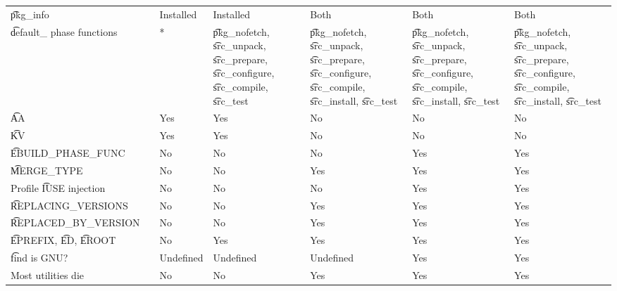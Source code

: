 \begin{landscape}
\begin{longtable}{llP{7.5em}P{7.5em}P{7.5em}P{7.5em}P{7.5em}}
\t{pkg\_info} &  &
    Installed & Installed & Both & Both & Both \\

\t{default\_} phase functions &  &
    * &
    \t{pkg\_nofetch}, \t{src\_unpack}, \t{src\_prepare}, \t{src\_configure},
        \t{src\_compile}, \t{src\_test} &
    \t{pkg\_nofetch}, \t{src\_unpack}, \t{src\_prepare}, \t{src\_configure},
        \t{src\_compile}, \t{src\_install}, \t{src\_test} &
    \t{pkg\_nofetch}, \t{src\_unpack}, \t{src\_prepare}, \t{src\_configure},
        \t{src\_compile}, \t{src\_install}, \t{src\_test} &
    \t{pkg\_nofetch}, \t{src\_unpack}, \t{src\_prepare}, \t{src\_configure},
        \t{src\_compile}, \t{src\_install}, \t{src\_test} \\

\t{AA} &  &
    Yes & Yes & No & No & No \\

\t{KV} &  &
    Yes & Yes & No & No & No \\

\t{EBUILD\_PHASE\_FUNC} &  &
    No & No & No & Yes & Yes \\

\t{MERGE\_TYPE} &  &
    No & No & Yes & Yes & Yes \\

Profile \t{IUSE} injection &  &
    No & No & No & Yes & Yes \\

\t{REPLACING\_VERSIONS} &  &
    No & No & Yes & Yes & Yes \\

\t{REPLACED\_BY\_VERSION} &  &
    No & No & Yes & Yes & Yes \\

\t{EPREFIX}, \t{ED}, \t{EROOT} &  &
    No & Yes & Yes & Yes & Yes \\

\t{find} is GNU? &  &
    Undefined & Undefined & Undefined & Yes & Yes \\

Most utilities die &  &
    No & No & Yes & Yes & Yes \\


\end{longtable}
\end{landscape}
